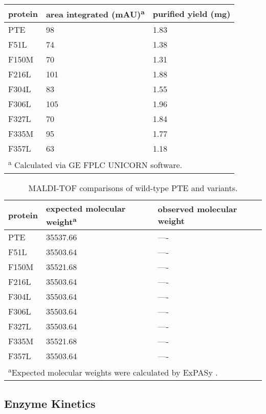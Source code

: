 \begin{refsection}
\begin{table}
\begin{tabular}{lll}
    protein & area integrated (mAU)\textsuperscript{a} & purified yield (mg) \\
    \hline

    PTE & 98 & 1.83 \\
    F51L & 74 & 1.38 \\
    F150M & 70 & 1.31 \\
    F216L & 101 & 1.88 \\
    F304L & 83 & 1.55 \\
    F306L & 105 & 1.96 \\
    F327L & 70 & 1.84 \\
    F335M & 95 & 1.77\\
    F357L & 63 & 1.18\\

    \hline
    \multicolumn{3}{l}{\textsuperscript{a} Calculated via GE FPLC UNICORN software.}
    \end{tabular}
    \label{tab:st1}
\end{table}
\begin{table}
    \caption{MALDI-TOF comparisons of wild-type PTE and variants.}
    \centering
    \begin{tabular}{lll}
    \hline

    protein & expected molecular weight\textsuperscript{a} & observed molecular weight \\
    \hline

    PTE & 35537.66 & ---- \\
    F51L & 35503.64 & ---- \\
    F150M & 35521.68 & ---- \\
    F216L & 35503.64 & ---- \\
    F304L & 35503.64 & ---- \\
    F306L & 35503.64 & ---- \\
    F327L & 35503.64 & ---- \\
    F335M & 35521.68 & ---- \\
    F357L & 35503.64 & ---- \\

    \hline      
     \multicolumn{3}{l}{\textsuperscript{a}Expected molecular weights were
     calculated by ExPASy \cite{Tools2010}.} \end{tabular}
    \label{tab:st2}
\end{table}

\subsection{Enzyme Kinetics}


\end{refsection}
